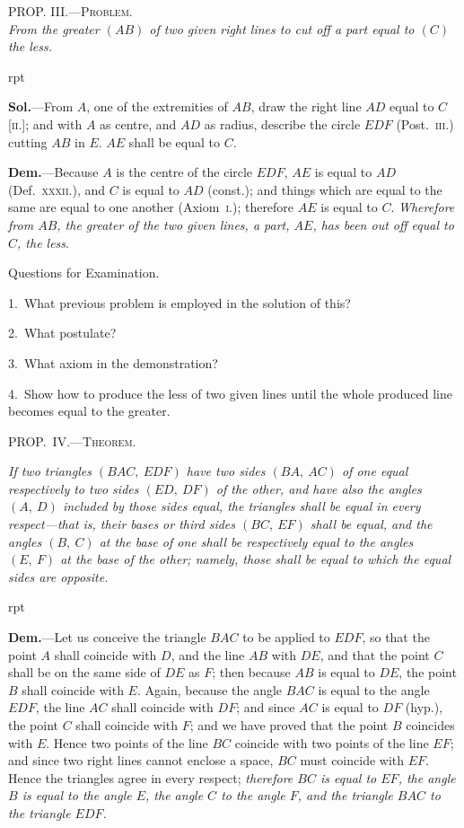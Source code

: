 \documentclass[oneside]{book}
\newcommand\myprop[2]{
\bigskip\Needspace*{4\baselineskip}\begin{center}\textsc{#1}\\\medskip\emph{#2}\par\end{center}
}
\newcommand\mypropl[2]{
\bigskip\Needspace*{4\baselineskip}\begin{center}\textsc{#1}\end{center}
\hspace{\parindent}\emph{#2}\par\medskip
}
\newcommand\exhead[1]{
\Needspace*{5\baselineskip}\begin{center}
\textsf{#1}
\end{center}
}
\newcommand\imgflow[3]{
\setcounter{wrapwidth}{#1}
\begin{wrapfigure}[#2]{r}{\value{wrapwidth}pt}
\begin{center}
\vspace{-0.3in}
\end{center}
\end{wrapfigure}
}
\begin{document}
\myprop{PROP\@. III\@.---Problem.}{From the greater $(AB)$ of two given right lines to cut off
a part equal to $(C)$ the less.}

\imgflow{133}{10}{f014}
\textbf{Sol.}---From $A$, one of the extremities of $AB$, draw
the right line $AD$ equal to $C$
[\textsc{ii.}]; and with $A$ as centre,
and $AD$ as radius, describe
the circle $EDF$ (Post.~\textsc{iii.})
cutting $AB$ in $E$. $AE$ shall
be equal to $C$.

\textbf{Dem.}---Because $A$ is the
centre of the circle $EDF$, $AE$
is equal to $AD$ (Def.~\textsc{xxxii.}),
and $C$ is equal to $AD$ (const.); and things which are
equal to the same are equal to one another (Axiom~\textsc{i.});
therefore $AE$ is equal to $C$. \emph{Wherefore from $AB$, the
greater of the two given lines, a part, $AE$, has been out off
equal to $C$, the less}.


\exhead{Questions for Examination.}

\begin{footnotesize}
1.~What previous problem is employed in the solution of this?

2.~What postulate?

3.~What axiom in the demonstration?

4.~Show how to produce the less of two given lines until the
whole produced line becomes equal to the greater.
\par\end{footnotesize}


\mypropl{PROP\@.~IV\@.---Theorem.}{If two triangles $(BAC,\ EDF)$ have two sides $(BA,\ AC)$
of one equal respectively to two sides $(ED,\ DF)$ of the
other, and have also the angles $(A,\ D)$ included by those
sides equal, the triangles shall be equal in every respect---that
is, their bases or third sides $(BC,\ EF)$ shall be equal,
and the angles $(B,\ C)$ at the base of one shall be respectively
equal to the angles $(E,\ F)$ at the base of the other;
namely, those shall be equal to which the equal sides are
opposite.}

\imgflow{163}{8}{f015}

\textbf{Dem.}---Let us conceive the triangle $BAC$ to be applied
to $EDF$, so that the
point $A$ shall coincide with
$D$, and the line $AB$ with
$DE$, and that the point $C$
shall be on the same side
of $DE$ as $F$; then because
$AB$ is equal to $DE$, the
point $B$ shall coincide
with $E$. Again, because the angle $BAC$ is equal to
the angle $EDF$, the line $AC$ shall coincide with $DF$;
and since $AC$ is equal to $DF$ (hyp.), the point $C$ shall
coincide with $F$; and we have proved that the point
$B$ coincides with $E$. Hence two points of the line $BC$
coincide with two points of the line $EF$; and since two
right lines cannot enclose a space, $BC$ must coincide
with $EF$. Hence the triangles agree in every respect;
\textit{therefore $BC$ is equal to $EF$, the angle $B$ is equal to the
angle $E$, the angle $C$ to the angle $F$, and the triangle $BAC$
to the triangle $EDF$.}
\end{document}
